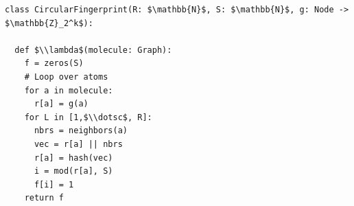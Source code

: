 \documentclass[border=10pt]{standalone}
\begin{document}
\begin{lstlisting}
class CircularFingerprint(R: $\mathbb{N}$, S: $\mathbb{N}$, g: Node -> $\mathbb{Z}_2^k$):

  def $\\lambda$(molecule: Graph):
    f = zeros(S)
    # Loop over atoms
    for a in molecule: 
      r[a] = g(a)
    for L in [1,$\\dotsc$, R]:
      nbrs = neighbors(a)
      vec = r[a] || nbrs
      r[a] = hash(vec)
      i = mod(r[a], S)
      f[i] = 1
    return f
\end{lstlisting}
\end{document}
